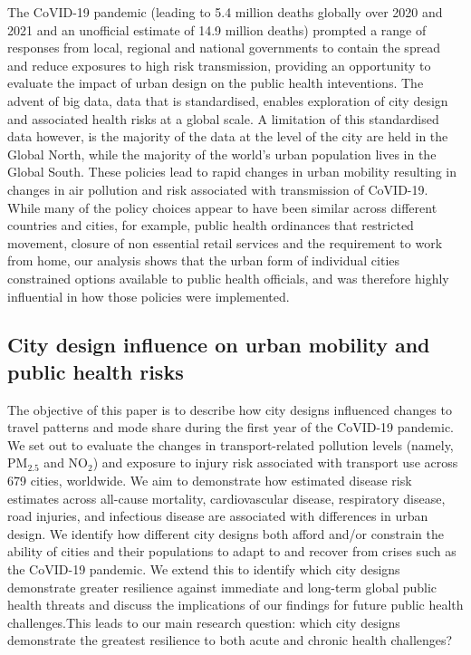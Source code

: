 \documentclass[preprint,10pt]{elsarticle} %
\begin{document}
The CoVID-19 pandemic (leading to 5.4 million deaths globally over 2020 and 2021 and an unofficial estimate of 14.9 million deaths\cite{Taylor2022}) prompted a range of responses from local, regional and national governments\cite{Hunter2023LPH} to contain the spread and reduce exposures to high risk transmission, providing an opportunity to evaluate the impact of urban design on the public health inteventions. The advent of big data, data that is standardised, enables exploration of city design and associated health risks at a global scale. A limitation of this standardised data however, is the majority of the data at the level of the city are held in the Global North, while the majority of the world's urban population lives in the Global South\cite{Smit2021}. These policies lead to rapid changes in urban mobility resulting in changes in air pollution and risk associated with transmission of CoVID-19\cite{Forster2020,He2020,LeQuere2020,Venter2020,thompson2022modelling}. While many of the policy choices appear to have been similar across different countries and cities, for example, public health ordinances that restricted movement, closure of non essential retail services and the requirement to work from home\cite{hale2021global}, our analysis shows that the urban form of individual cities constrained options available to public health officials, and was therefore highly influential in how those policies were implemented.

\subsection*{City design influence on urban mobility and public health risks}
The objective of this paper is to describe how city designs influenced changes to travel patterns and mode share during the first year of the CoVID-19 pandemic. We set out to evaluate the changes in transport-related pollution levels (namely, PM$_{2.5}$ and NO$_{2}$) and exposure to injury risk associated with transport use across 679 cities, worldwide. We aim to demonstrate how estimated disease risk estimates across all-cause mortality, cardiovascular disease, respiratory disease, road injuries, and infectious disease are associated with differences in urban design. We identify how different city designs both afford and/or constrain the ability of cities and their populations to adapt to and recover from crises such as the CoVID-19 pandemic. We extend this to identify which city designs demonstrate greater resilience against immediate and long-term global public health threats and discuss the implications of our findings for future public health challenges.This leads to our main research question: which city designs demonstrate the greatest resilience to both acute and chronic health challenges?
\end{document}
